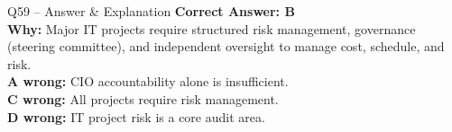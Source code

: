 \documentclass[aspectratio=169,10pt]{beamer}
\begin{document}
	\begin{frame}[t]{Q59 -- Answer \& Explanation}
		\small
		\textbf{Correct Answer: B} \\
		\textbf{Why:} Major IT projects require structured risk management, governance (steering committee), and independent oversight to manage cost, schedule, and risk. \\
		\textbf{A wrong:} CIO accountability alone is insufficient. \\
		\textbf{C wrong:} All projects require risk management. \\
		\textbf{D wrong:} IT project risk is a core audit area.
	\end{frame}
\end{document}
